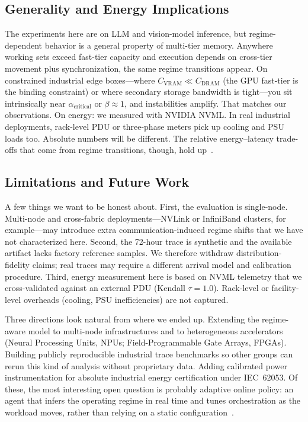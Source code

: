 \subsection{Generality and Energy Implications}
The experiments here are on LLM and vision-model inference, but regime-dependent behavior is a general property of multi-tier memory.
Anywhere working sets exceed fast-tier capacity and execution depends on cross-tier movement plus synchronization, the same regime transitions appear.
On constrained industrial edge boxes---where $C_{\mathrm{VRAM}} \ll C_{\mathrm{DRAM}}$ (the GPU fast-tier is the binding constraint) or where secondary storage bandwidth is tight---you sit intrinsically near $\alpha_{\mathrm{critical}}$ or $\beta \approx 1$, and instabilities amplify. That matches our observations.
On energy: we measured with NVIDIA NVML.
In real industrial deployments, rack-level PDU or three-phase meters pick up cooling and PSU loads too. Absolute numbers will be different. The relative energy--latency trade-offs that come from regime transitions, though, hold up~\cite{huang2019gpipe,stojkovic2025dynamollm}.

\subsection{Limitations and Future Work}
\label{sec:future_work}

A few things we want to be honest about.
First, the evaluation is single-node. Multi-node and cross-fabric deployments---NVLink or InfiniBand clusters, for example---may introduce extra communication-induced regime shifts that we have not characterized here.
Second, the 72-hour trace is synthetic and the available artifact lacks factory reference samples. We therefore withdraw distribution-fidelity claims; real traces may require a different arrival model and calibration procedure.
Third, energy measurement here is based on NVML telemetry that we cross-validated against an external PDU (Kendall $\tau=1.0$). Rack-level or facility-level overheads (cooling, PSU inefficiencies) are not captured.

Three directions look natural from where we ended up.
Extending the regime-aware model to multi-node infrastructures and to heterogeneous accelerators (Neural Processing Units, NPUs; Field-Programmable Gate Arrays, FPGAs).
Building publicly reproducible industrial trace benchmarks so other groups can rerun this kind of analysis without proprietary data.
Adding calibrated power instrumentation for absolute industrial energy certification under IEC~62053.
Of these, the most interesting open question is probably adaptive online policy: an agent that infers the operating regime in real time and tunes orchestration as the workload moves, rather than relying on a static configuration~\cite{stojkovic2025dynamollm}.
